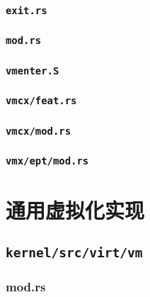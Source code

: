\documentclass[code]{mancls}
\begin{document}
\subsubsection{\texttt{exit.rs}}


\subsubsection{\texttt{mod.rs}}


\subsubsection{\texttt{vmenter.S}}


\subsubsection{\texttt{vmcx/feat.rs}}


\subsubsection{\texttt{vmcx/mod.rs}}


\subsubsection{\texttt{vmx/ept/mod.rs}}



\section{通用虚拟化实现}

\subsection{\texttt{kernel/src/virt/vm}}

\subsubsection{mod.rs}

\end{document}
